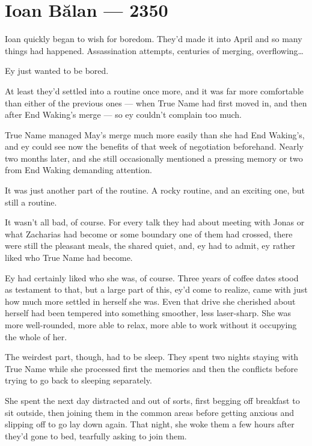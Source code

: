 \hypertarget{ioan-bux103lan-2350}{%
\chapter{Ioan Bălan — 2350}\label{ioan-bux103lan-2350}}

Ioan quickly began to wish for boredom. They'd made it into April and so many things had happened. Assassination attempts, centuries of merging, overflowing\ldots{}

Ey just wanted to be bored.

At least they'd settled into a routine once more, and it was far more comfortable than either of the previous ones — when True Name had first moved in, and then after End Waking's merge — so ey couldn't complain too much.

True Name managed May's merge much more easily than she had End Waking's, and ey could see now the benefits of that week of negotiation beforehand. Nearly two months later, and she still occasionally mentioned a pressing memory or two from End Waking demanding attention.

It was just another part of the routine. A rocky routine, and an exciting one, but still a routine.

It wasn't all bad, of course. For every talk they had about meeting with Jonas or what Zacharias had become or some boundary one of them had crossed, there were still the pleasant meals, the shared quiet, and, ey had to admit, ey rather liked who True Name had become.

Ey had certainly liked who she was, of course. Three years of coffee dates stood as testament to that, but a large part of this, ey'd come to realize, came with just how much more settled in herself she was. Even that drive she cherished about herself had been tempered into something smoother, less laser-sharp. She was more well-rounded, more able to relax, more able to work without it occupying the whole of her.

The weirdest part, though, had to be sleep. They spent two nights staying with True Name while she processed first the memories and then the conflicts before trying to go back to sleeping separately.

She spent the next day distracted and out of sorts, first begging off breakfast to sit outside, then joining them in the common areas before getting anxious and slipping off to go lay down again. That night, she woke them a few hours after they'd gone to bed, tearfully asking to join them.

